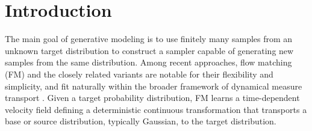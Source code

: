 \documentclass[a4paper,11pt]{article}
\theoremstyle{plain}
\theoremstyle{definition}
\begin{document}
\begin{abstract}
\end{abstract}



\section{Introduction}
The main goal of generative modeling is to use finitely many samples from an unknown target distribution to construct a sampler capable of generating new samples from the same  distribution. Among recent approaches, flow matching (FM) \cite{lipman2022flow, lipman2024flow} and the closely related variants \cite{albergo2023stochastic, liu2022flow} are notable for their flexibility and simplicity, and fit naturally within the broader framework of dynamical measure transport \cite{marzouk2016introduction}.  Given a target probability distribution, FM learns a time-dependent velocity field defining a deterministic continuous transformation that transports a base or source distribution, typically Gaussian, to the target distribution.
\end{document}
